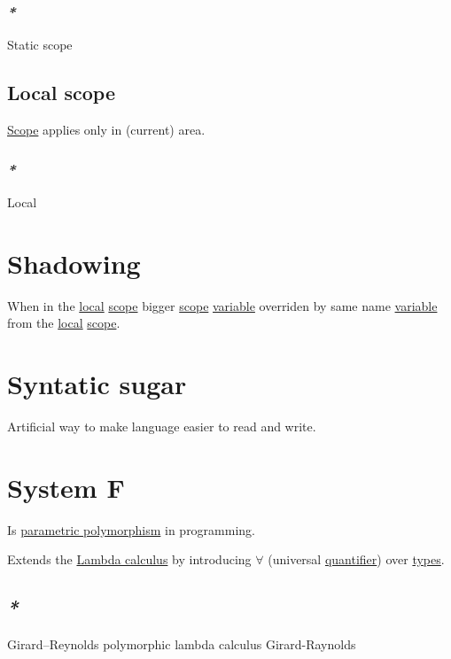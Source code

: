 \documentclass[a4paper,14pt,oneside]{book}
\begin{document}
\subsubsection{\emph{*}}
\label{sec:org888575e}

\label{org07f00c3}Static scope

\subsection{\label{orgabaef00}Local scope}
\label{sec:org9f8d3a3}
\hyperref[org8dd0b03]{Scope} applies only in (current) area.

\subsubsection{\emph{*}}
\label{sec:orgd1bf877}

\label{org74f8a54}Local

\section{\label{orgc9609d7}Shadowing}
\label{sec:orgfd06b07}
When in the \hyperref[org74f8a54]{local} \hyperref[org8dd0b03]{scope} bigger \hyperref[org8dd0b03]{scope} \hyperref[orgfd9dbe7]{variable} overriden by same name \hyperref[orgfd9dbe7]{variable} from the \hyperref[org74f8a54]{local} \hyperref[org8dd0b03]{scope}.

\section{\label{org5fb8da2}Syntatic sugar}
\label{sec:org577a5a5}
Artificial way to make language easier to read and write.

\section{\label{org2e7d34c}System F}
\label{sec:org41f21e1}
Is \hyperref[org25e941f]{parametric polymorphism} in programming.

Extends the \hyperref[org1198996]{Lambda calculus} by introducing \(\forall\) (universal \hyperref[orgb06cf41]{quantifier}) over \hyperref[org6c15f12]{types}.

\subsection{\emph{*}}
\label{sec:orga191254}

\label{orgeb604f9}Girard–Reynolds polymorphic lambda calculus
\label{org2ae7b38}Girard-Raynolds
\end{document}
